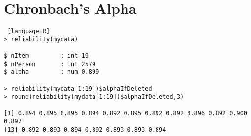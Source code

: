\section{Chronbach's Alpha}
\label{E}

\begin{lstlisting} [language=R]
> reliability(mydata)

$ nItem         : int 19
$ nPerson       : int 2579
$ alpha         : num 0.899

> reliability(mydata[1:19])$alphaIfDeleted
> round(reliability(mydata[1:19])$alphaIfDeleted,3)

[1] 0.894 0.895 0.895 0.894 0.892 0.895 0.892 0.892 0.896 0.892 0.900 0.897
[13] 0.892 0.893 0.894 0.892 0.893 0.893 0.894


\end{lstlisting}